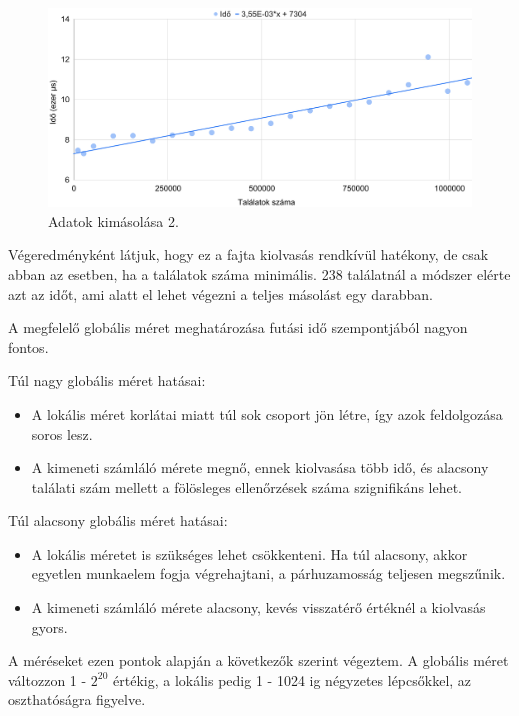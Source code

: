 \begin{figure}[h!]
\centering
\includegraphics[width=14.8cm]{images/graph/outpuffer2_2.png}
\caption{Adatok kimásolása 2.}
\label{fig:schema}
\end{figure}

Végeredményként látjuk, hogy ez a fajta kiolvasás rendkívül hatékony, de csak abban az esetben, ha a találatok száma minimális.
238 találatnál a módszer elérte azt az időt, ami alatt el lehet végezni a teljes másolást egy darabban.


A megfelelő globális méret meghatározása futási idő szempontjából nagyon fontos.

Túl nagy globális méret hatásai:
\begin{itemize}
\item A lokális méret korlátai miatt túl sok csoport jön létre, így azok feldolgozása soros lesz.
\item A kimeneti számláló mérete megnő, ennek kiolvasása több idő, és alacsony találati szám mellett a fölösleges ellenőrzések száma szignifikáns lehet.
\end{itemize}

Túl alacsony globális méret hatásai:
\begin{itemize}
\item A lokális méretet is szükséges lehet csökkenteni. Ha túl alacsony, akkor egyetlen munkaelem fogja végrehajtani, a párhuzamosság teljesen megszűnik.
\item A kimeneti számláló mérete alacsony, kevés visszatérő értéknél a kiolvasás gyors.
\end{itemize}
A méréseket ezen pontok alapján a következők szerint végeztem.
A globális méret változzon 1 - $2^{20}$ értékig, a lokális pedig 1 - 1024 ig négyzetes lépcsőkkel, az oszthatóságra figyelve.

